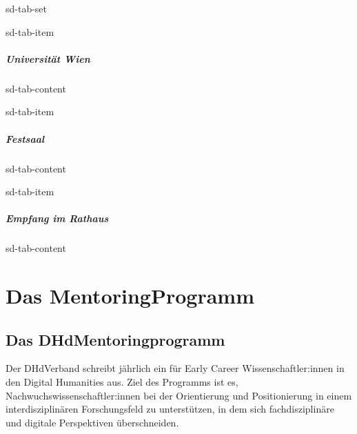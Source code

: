 \documentclass[letterpaper,10pt,english]{jupyterBook}
\begin{document}
\begin{sphinxuseclass}{sd-tab-set}
\begin{sphinxuseclass}{sd-tab-item}\subsubsection*{Universität Wien}

\begin{sphinxuseclass}{sd-tab-content}
\sphinxAtStartPar
{}

\end{sphinxuseclass}
\end{sphinxuseclass}
\begin{sphinxuseclass}{sd-tab-item}\subsubsection*{Festsaal}

\begin{sphinxuseclass}{sd-tab-content}
\sphinxAtStartPar
{}

\end{sphinxuseclass}
\end{sphinxuseclass}
\begin{sphinxuseclass}{sd-tab-item}\subsubsection*{Empfang im Rathaus}

\begin{sphinxuseclass}{sd-tab-content}
\sphinxAtStartPar
{}

\end{sphinxuseclass}
\end{sphinxuseclass}
\end{sphinxuseclass}
\sphinxstepscope


\part{Das Mentoring\sphinxhyphen{}Programm}

\sphinxstepscope


\chapter{Das DHd\sphinxhyphen{}Mentoringprogramm}
\label{\detokenize{mentoring/programm:das-dhd-mentoringprogramm}}\label{\detokenize{mentoring/programm::doc}}
\sphinxAtStartPar
Der DHd\sphinxhyphen{}Verband schreibt jährlich ein  für Early Career Wissenschaftler:innen in den Digital Humanities aus. Ziel des Programms ist es, Nachwuchswissenschaftler:innen bei der Orientierung und Positionierung in einem interdisziplinären Forschungsfeld zu unterstützen, in dem sich fachdisziplinäre und digitale Perspektiven überschneiden.
\end{document}
